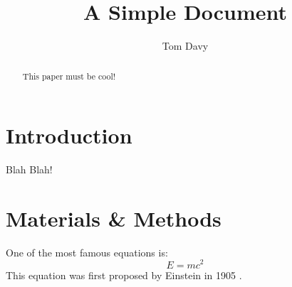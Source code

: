 \documentclass[12pt]{article}
\title{A Simple Document}
\author{Tom Davy}
\date{}
\begin{document}
	\maketitle
	
	\begin{abstract}
	  This paper must be cool!
	\end{abstract}
	
	\section{Introduction}
	  Blah Blah!
	  
	\section{Materials \& Methods}
	One of the most famous equations is:
	\begin{equation}
	  E = mc^2
	\end{equation}
	This equation was first proposed by Einstein in 1905
	\cite{einstein1905does}.
	
	
	
\end{document}
